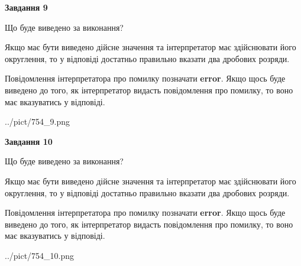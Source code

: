 \documentclass[12pt, ukrainian]{article}
\begin{document}
{\begin {Large}
{\begin {center}\textbf{Завдання 9}\end {center}}\par
Що буде виведено за виконання? \par

Якщо має бути виведено дійсне значення та інтерпретатор має здійснювати його округлення, 
то у відповіді достатньо правильно вказати два дробових розряди.

Повідомлення інтерпретатора про помилку позначати \textbf{error}.
Якщо щось буде виведено до того, як інтерпретатор видасть повідомлення про помилку, 
то воно має вказуватись у відповіді. \par

\begin{center}
	{../pict/754_9.png}
\end{center}
\newpage

{\begin {center}\textbf{Завдання 10}\end {center}}\par
Що буде виведено за виконання? \par

Якщо має бути виведено дійсне значення та інтерпретатор має здійснювати його округлення, 
то у відповіді достатньо правильно вказати два дробових розряди.

Повідомлення інтерпретатора про помилку позначати \textbf{error}.
Якщо щось буде виведено до того, як інтерпретатор видасть повідомлення про помилку, 
то воно має вказуватись у відповіді. \par

\begin{center}
	{../pict/754_10.png}
\end{center}
\newpage

\end {Large}}
\end{document}
